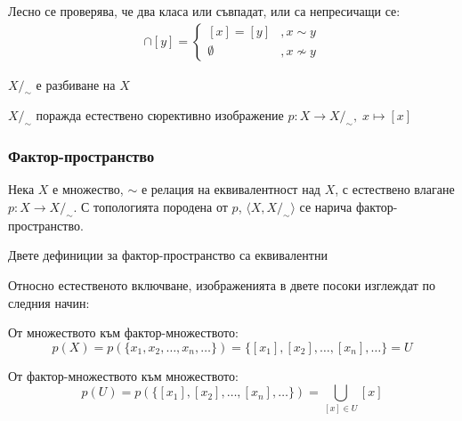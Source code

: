 \begin{fact}
    Лесно се проверява, че два класа или съвпадат, или са непресичащи се:
    \begin{eqnarray}
        [x] \cap [y] = \begin{cases}
            [x] = [y] &, x \sim y\\
            \emptyset &, x \not\sim y
        \end{cases}
    \end{eqnarray}
\end{fact}

\begin{corollary}
    $X/_\sim$ е разбиване на $X$
\end{corollary}
\begin{corollary}
    $X/_\sim$ поражда естествено сюрективно изображение $p: X \to X/_\sim,\; x \mapsto [x]$
\end{corollary}

\subsubsection{Фактор-пространство}
\begin{definition}
    Нека $X$ е множество, $\sim$ е релация на еквивалентност над $X$, с естествено влагане $p: X \to X/_\sim$. С топологията породена от $p$, $\langle X, X/_\sim\rangle$ се нарича фактор-пространство.
\end{definition}
\begin{proposition}
    Двете дефиниции за фактор-пространство са еквивалентни
\end{proposition}
\begin{fact}
    Относно естественото включване, изображенията в двете посоки изглеждат по следния начин:

    От множеството към фактор-множеството:
    \begin{equation}
        p(X) = p(\{x_1, x_2, \dots, x_n, \dots\}) = \{[x_1], [x_2], \dots, [x_n], \dots\} = U
    \end{equation}

    От фактор-множеството към множеството:
    \begin{equation}
        p(U) = p(\{[x_1], [x_2], \dots, [x_n], \dots\}) = \bigcup_{[x] \in U} [x]
    \end{equation}
\end{fact}

